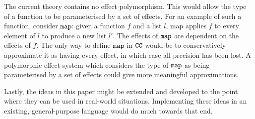 The current theory contains no effect polymorphism. This would allow the type of a function to be parameterised by a set of effects. For an example of such a function, consider $\mathtt{map}$: given a function $f$ and a list $l$, map applies $f$ to every element of $l$ to produce a new list $l'$. The effects of $\mathtt{map}$ are dependent on the effects of $f$. The only way to define $\mathtt{map}$ in $\mathtt{CC}$ would be to conservatively approximate it as having every effect, in which case all precision has been lost. A polymorphic effect system which considers the type of $\mathtt{map}$ as being parameterised by a set of effects could give more meaningful approximations.

Lastly, the ideas in this paper might be extended and developed to the point where they can be used in real-world situations. Implementing these ideas in an existing, general-purpose language would do much towards that end.







